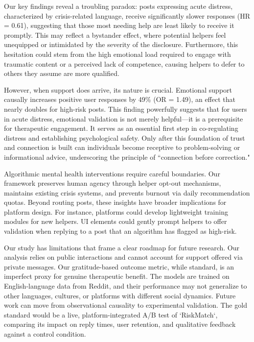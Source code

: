 \documentclass[letterpaper]{article} %
\begin{document}
Our key findings reveal a troubling paradox: posts expressing acute distress, characterized by crisis-related language, receive significantly slower responses (HR = 0.61), suggesting that those most needing help are least likely to receive it promptly. This may reflect a bystander effect, where potential helpers feel unequipped or intimidated by the severity of the disclosure. Furthermore, this hesitation could stem from the high emotional load required to engage with traumatic content or a perceived lack of competence, causing helpers to defer to others they assume are more qualified.

However, when support does arrive, its nature is crucial. Emotional support causally increases positive user responses by 49\% (OR = 1.49), an effect that nearly doubles for high-risk posts. This finding powerfully suggests that for users in acute distress, emotional validation is not merely helpful—it is a prerequisite for therapeutic engagement. It serves as an essential first step in co-regulating distress and establishing psychological safety. Only after this foundation of trust and connection is built can individuals become receptive to problem-solving or informational advice, underscoring the principle of ``connection before correction."

Algorithmic mental health interventions require careful boundaries. Our framework preserves human agency through helper opt-out mechanisms, maintains existing crisis systems, and prevents burnout via daily recommendation quotas. Beyond routing posts, these insights have broader implications for platform design. For instance, platforms could develop lightweight training modules for new helpers. UI elements could gently prompt helpers to offer validation when replying to a post that an algorithm has flagged as high-risk.

Our study has limitations that frame a clear roadmap for future research. Our analysis relies on public interactions and cannot account for support offered via private messages. Our gratitude-based outcome metric, while standard, is an imperfect proxy for genuine therapeutic benefit. The models are trained on English-language data from Reddit, and their performance may not generalize to other languages, cultures, or platforms with different social dynamics. Future work can move from observational causality to experimental validation. The gold standard would be a live, platform-integrated A/B test of `RiskMatch`, comparing its impact on reply times, user retention, and qualitative feedback against a control condition. 
\end{document}
